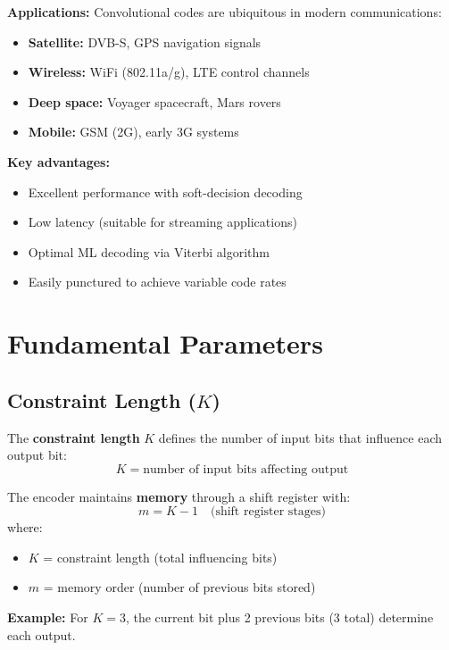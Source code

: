 \textbf{Applications:} Convolutional codes are ubiquitous in modern communications:
\begin{itemize}
\item \textbf{Satellite:} DVB-S, GPS navigation signals
\item \textbf{Wireless:} WiFi (802.11a/g), LTE control channels
\item \textbf{Deep space:} Voyager spacecraft, Mars rovers
\item \textbf{Mobile:} GSM (2G), early 3G systems
\end{itemize}

\textbf{Key advantages:}
\begin{itemize}
\item Excellent performance with soft-decision decoding
\item Low latency (suitable for streaming applications)
\item Optimal ML decoding via Viterbi algorithm
\item Easily punctured to achieve variable code rates
\end{itemize}

\section{Fundamental Parameters}

\subsection{Constraint Length ($K$)}

The \textbf{constraint length} $K$ defines the number of input bits that influence each output bit:
\begin{equation}
K = \text{number of input bits affecting output}
\label{eq:constraint-length}
\end{equation}

The encoder maintains \textbf{memory} through a shift register with:
\begin{equation}
m = K - 1 \quad \text{(shift register stages)}
\label{eq:memory-order}
\end{equation}
where:
\begin{itemize}
\item $K$ = constraint length (total influencing bits)
\item $m$ = memory order (number of previous bits stored)
\end{itemize}

\textbf{Example:} For $K = 3$, the current bit plus 2 previous bits (3 total) determine each output.

